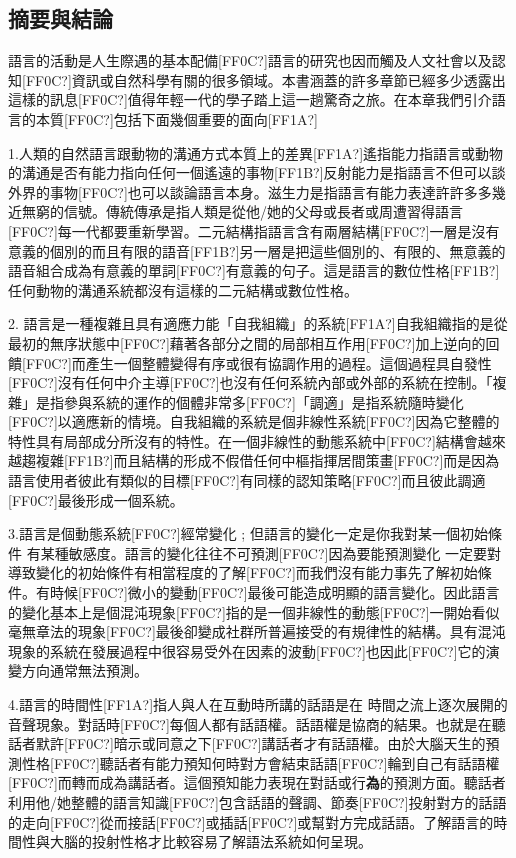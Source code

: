 \subsection{摘要與結論} %

語言的活動是人生際遇的基本配備[FF0C?]語言的研究也因而觸及人文社會以及認知[FF0C?]資訊或自然科學有關的很多領域。本書涵蓋的許多章節已經多少透露出這樣的訊息[FF0C?]值得年輕一代的學子踏上這一趟驚奇之旅。在本章我們引介語言的本質[FF0C?]包括下面幾個重要的面向[FF1A?]

1.人類的自然語言跟動物的溝通方式本質上的差異[FF1A?]遙指能力指語言或動物的溝通是否有能力指向任何一個遙遠的事物[FF1B?]反射能力是指語言不但可以談外界的事物[FF0C?]也可以談論語言本身。滋生力是指語言有能力表達許許多多幾近無窮的信號。傳統傳承是指人類是從他/她的父母或長者或周遭習得語言[FF0C?]每一代都要重新學習。二元結構指語言含有兩層結構[FF0C?]一層是沒有意義的個別的而且有限的語音[FF1B?]另一層是把這些個別的、有限的、無意義的語音組合成為有意義的單詞[FF0C?]有意義的句子。這是語言的數位性格[FF1B?]任何動物的溝通系統都沒有這樣的二元結構或數位性格。

2. 語言是一種複雜且具有適應力能「自我組織」的系統[FF1A?]自我組織指的是從最初的無序狀態中[FF0C?]藉著各部分之間的局部相互作用[FF0C?]加上逆向的回饋[FF0C?]而產生一個整體變得有序或很有協調作用的過程。這個過程具自發性[FF0C?]沒有任何中介主導[FF0C?]也沒有任何系統內部或外部的系統在控制。「複雜」是指參與系統的運作的個體非常多[FF0C?]「調適」是指系統隨時變化[FF0C?]以適應新的情境。自我組織的系統是個非線性系統[FF0C?]因為它整體的特性具有局部成分所沒有的特性。在一個非線性的動態系統中[FF0C?]結構會越來越趨複雜[FF1B?]而且結構的形成不假借任何中樞指揮居間策畫[FF0C?]而是因為語言使用者彼此有類似的目標[FF0C?]有同樣的認知策略[FF0C?]而且彼此調適[FF0C?]最後形成一個系統。

3.語言是個動態系統[FF0C?]經常變化 ; 但語言的變化一定是你我對某一個初始條件 有某種敏感度。語言的變化往往不可預測[FF0C?]因為要能預測變化 一定要對導致變化的初始條件有相當程度的了解[FF0C?]而我們沒有能力事先了解初始條件。有時候[FF0C?]微小的變動[FF0C?]最後可能造成明顯的語言變化。因此語言的變化基本上是個混沌現象[FF0C?]指的是一個非線性的動態[FF0C?]一開始看似毫無章法的現象[FF0C?]最後卻變成社群所普遍接受的有規律性的結構。具有混沌現象的系統在發展過程中很容易受外在因素的波動[FF0C?]也因此[FF0C?]它的演變方向通常無法預測。

4.語言的時間性[FF1A?]指人與人在互動時所講的話語是在 時間之流上逐次展開的音聲現象。對話時[FF0C?]每個人都有話語權。話語權是協商的結果。也就是在聽話者默許[FF0C?]暗示或同意之下[FF0C?]講話者才有話語權。由於大腦天生的預測性格[FF0C?]聽話者有能力預知何時對方會結束話語[FF0C?]輪到自己有話語權[FF0C?]而轉而成為講話者。這個預知能力表現在對話或行\textbf{為}的預測方面。聽話者利用他/她整體的語言知識[FF0C?]包含話語的聲調、節奏[FF0C?]投射對方的話語的走向[FF0C?]從而接話[FF0C?]或插話[FF0C?]或幫對方完成話語。了解語言的時間性與大腦的投射性格才比較容易了解語法系統如何呈現。

